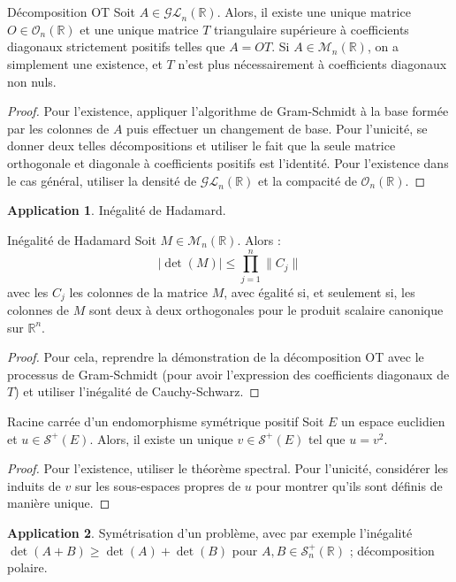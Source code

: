 \documentclass[french]{article}
\newcommand{\R}{\mathbb{R}}
\theoremstyle{definition}
\newtheorem*{app}{Application}
\begin{document}
\begin{lem}{Décomposition OT}
	Soit $A\in\mathcal{GL}_n(\R)$. Alors, il existe une unique matrice $O\in\mathcal{O}_n(\R)$ et une unique matrice $T$ triangulaire supérieure à coefficients diagonaux strictement positifs telles que $A=OT$. Si $A\in\mathcal{M}_n(\R)$, on a simplement une existence, et $T$ n'est plus nécessairement à coefficients diagonaux non nuls.
\end{lem}
\begin{proof}
	Pour l'existence, appliquer l'algorithme de Gram-Schmidt à la base formée par les colonnes de $A$ puis effectuer un changement de base. Pour l'unicité, se donner deux telles décompositions et utiliser le fait que la seule matrice orthogonale et diagonale à coefficients positifs est l'identité. Pour l'existence dans le cas général, utiliser la densité de $\mathcal{GL}_n(\R)$ et la compacité de $\mathcal{O}_n(\R)$.
\end{proof}
\begin{app}
	Inégalité de Hadamard.
\end{app}

\begin{lem}{Inégalité de Hadamard}
	Soit $M\in\mathcal{M}_n(\R)$. Alors : $$\lvert\det(M)\rvert\leqslant\prod_{j=1}^{n}\lVert C_j\rVert$$ avec les $C_j$ les colonnes de la matrice $M$, avec égalité si, et seulement si, les colonnes de $M$ sont deux à deux orthogonales pour le produit scalaire canonique sur $\R^n$.
\end{lem}
\begin{proof}
	Pour cela, reprendre la démonstration de la décomposition OT avec le processus de Gram-Schmidt (pour avoir l'expression des coefficients diagonaux de $T$) et utiliser l'inégalité de Cauchy-Schwarz.
\end{proof}

\begin{lem}{Racine carrée d'un endomorphisme symétrique positif}
	Soit $E$ un espace euclidien et $u\in\mathcal{S}^+(E)$. Alors, il existe un unique $v\in\mathcal{S}^+(E)$ tel que $u=v^2$.
\end{lem}
\begin{proof}
	Pour l'existence, utiliser le théorème spectral. Pour l'unicité, considérer les induits de $v$ sur les sous-espaces propres de $u$ pour montrer qu'ils sont définis de manière unique.
\end{proof}
\begin{app}
	Symétrisation d'un problème, avec par exemple l'inégalité $\det(A+B)\geqslant\det(A)+\det(B)$ pour $A,B\in\mathcal{S}_n^+(\R)$ ; décomposition polaire.
\end{app}
\end{document}
